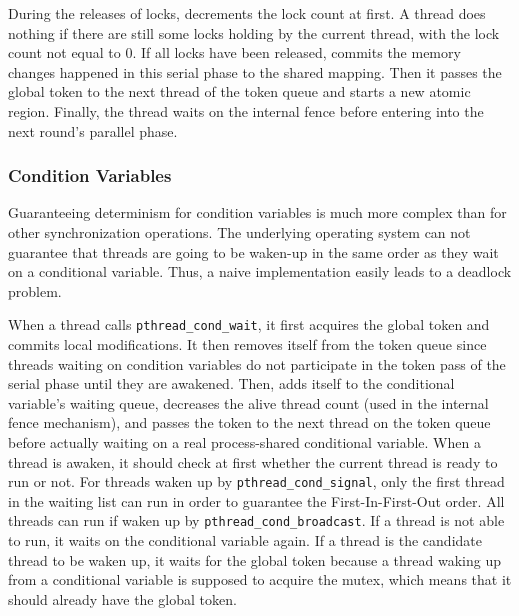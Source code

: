 During the releases of locks, \dthreads{} decrements the lock count at first. A thread does nothing if there are still some locks holding by the current thread, with the lock count not equal to 0. If all locks have been released, \dthreads{} commits the memory changes happened in this serial phase to the shared mapping. Then it passes the global token to the next thread of the token queue and starts a new atomic region. Finally, the thread waits on the internal fence before entering into the next round's parallel phase.

\subsubsection{Condition Variables}
\label{sec:condwait}

Guaranteeing determinism for condition variables is much more complex than for other synchronization operations. The underlying operating system can not guarantee that threads are going to be waken-up in the same order as they wait on a conditional variable. Thus, a naive implementation easily leads to a deadlock problem.

When a thread calls \texttt{pthread\_cond\_wait}, it first acquires the global token and commits local modifications. It then removes itself from the token queue since threads waiting on condition variables do not participate in the token pass of the serial phase until they are awakened. Then, \dthreads{} adds itself to the conditional variable's waiting queue, decreases the alive thread count (used in the internal fence mechanism), and passes the token to the next thread on the token queue before actually waiting on a real process-shared conditional variable. When a thread is awaken, it should check at first whether the current thread is ready to run or not. For threads waken up by \texttt{pthread\_cond\_signal}, only the first thread in the waiting list can run in order to guarantee the First-In-First-Out order. All threads can run if waken up by \texttt{pthread\_cond\_broadcast}. If a thread is not able to run, it waits on the conditional variable again. If a thread is the candidate thread to be waken up, it waits for the global token because a thread waking up from a conditional variable is supposed to acquire the mutex, which means that it should already have the global token. 

